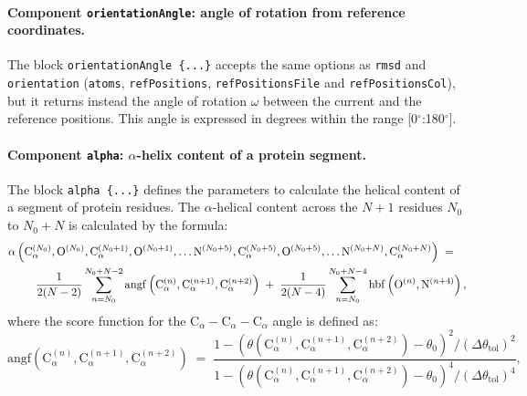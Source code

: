 \paragraph*{Component \texttt{orientationAngle}: angle of rotation
  from reference coordinates.}  The block
\texttt{orientationAngle~\{...\}} accepts the same options as
\texttt{rmsd} and \texttt{orientation} (\texttt{atoms},
\texttt{refPositions}, \texttt{refPositionsFile} and
\texttt{refPositionsCol}), but it returns instead the angle of
rotation $\omega$ between the current and the reference positions.
This angle is expressed in degrees within the range
[0$^{\circ}$:180$^{\circ}$].




\paragraph*{Component \texttt{alpha}: $\alpha$-helix content of a
  protein segment.}  The block \texttt{alpha~\{...\}} defines the
parameters to calculate the helical content of a segment of protein
residues.  The $\alpha$-helical content across the $N+1$ residues
$N_{0}$ to $N_{0}+N$ is calculated by the formula:
\begin{eqnarray}
  \label{eq:colvars_alpha}
  { 
    \alpha\left(
      \mathrm{C}_{\alpha}^{(N_{0})},
      \mathrm{O}^{(N_{0})},
      \mathrm{C}_{\alpha}^{(N_{0}+1)},
      \mathrm{O}^{(N_{0}+1)},
      \ldots
      \mathrm{N}^{(N_{0}+5)},
      \mathrm{C}_{\alpha}^{(N_{0}+5)},
      \mathrm{O}^{(N_{0}+5)},
      \ldots
      \mathrm{N}^{(N_{0}+N)},
      \mathrm{C}_{\alpha}^{(N_{0}+N)}
    \right)
  } \; = \; \; \; \; \\ \; \; \; \; {
    \nonumber
    \frac{1}{2(N-2)} 
    \sum_{n=N_{0}}^{N_{0}+N-2}
    \mathrm{angf}\left(
        \mathrm{C}_{\alpha}^{(n)},
        \mathrm{C}_{\alpha}^{(n+1)},
        \mathrm{C}_{\alpha}^{(n+2)}\right)
  } \; + \; {
    \frac{1}{2(N-4)} 
    \sum_{n=N_{0}}^{N_{0}+N-4}
    \mathrm{hbf}\left(
      \mathrm{O}^{(n)},
      \mathrm{N}^{(n+4)}\right) \mathrm{,}
  } \\
\end{eqnarray}
where the score function for the $\mathrm{C}_{\alpha} -
\mathrm{C}_{\alpha} - \mathrm{C}_{\alpha}$ angle is defined as: 
\begin{equation}
  \label{eq:colvars_alpha_Calpha}
  {
    \mathrm{angf}\left(
      \mathrm{C}_{\alpha}^{(n)},
      \mathrm{C}_{\alpha}^{(n+1)},
      \mathrm{C}_{\alpha}^{(n+2)}\right)
  } \; = \; {
    \frac{1 - \left(\theta(
        \mathrm{C}_{\alpha}^{(n)},
        \mathrm{C}_{\alpha}^{(n+1)},
        \mathrm{C}_{\alpha}^{(n+2)}) -
        \theta_{0}\right)^{2} /
      \left(\Delta\theta_{\mathrm{tol}}\right)^{2}}{
      1 - \left(\theta(
        \mathrm{C}_{\alpha}^{(n)},
        \mathrm{C}_{\alpha}^{(n+1)},
        \mathrm{C}_{\alpha}^{(n+2)}) -
        \theta_{0}\right)^{4} /
      \left(\Delta\theta_{\mathrm{tol}}\right)^{4}} \mathrm{,}
  }
\end{equation}
